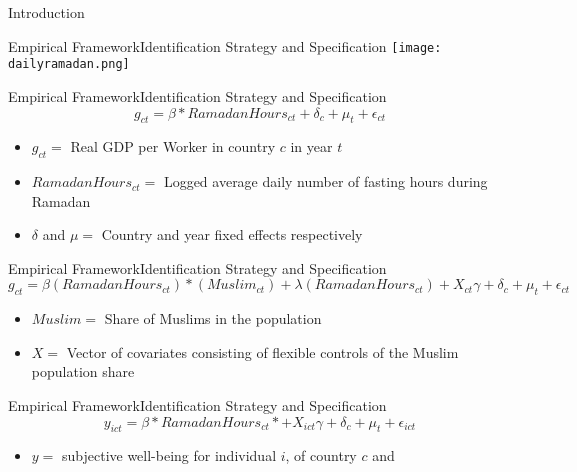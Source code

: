 \documentclass[pdftex,12pt,xcolor=pdftex,table]{beamer}
\begin{document}
\begin{frame}{Introduction}
    \begin{frame}{Empirical Framework}{Identification Strategy and Specification}
    \centering
    \texttt{[image: dailyramadan.png]}
    \end{frame}
    
    \begin{frame}{Empirical Framework}{Identification Strategy and Specification}
    \begin{equation}
    \nonumber g_{ct}=\beta *RamadanHours_{ct}+\delta_c+\mu_t+\epsilon_{ct}
    \end{equation}
    \vspace{0.5cm}
    \begin{itemize}
    \item<2-> $g_{ct}=$ Real GDP per Worker in country $c$ in year $t$
    \item<3-> $RamadanHours_{ct}=$ Logged average daily number of fasting hours during Ramadan
    \item<4-> $\delta$ and $\mu=$ Country and year fixed effects respectively
    \end{itemize}
    \end{frame}
    
    \begin{frame}{Empirical Framework}{Identification Strategy and Specification}
    \begin{equation}
    \nonumber g_{ct}=\beta(RamadanHours_{ct})*(Muslim_{ct})+\lambda(RamadanHours_{ct})
    
    +X_{ct}\gamma+\delta_c+\mu_t+\epsilon_{ct}
    \end{equation}
    \vspace{0.5cm}
    \begin{itemize}
    \item<2-> $Muslim=$ Share of Muslims in the population
    \item<3-> $X=$ Vector of covariates consisting of flexible controls of the Muslim population share
    \end{itemize}
    \end{frame}
    
    \begin{frame}{Empirical Framework}{Identification Strategy and Specification}
    \begin{equation}
    \nonumber y_{ict}=\beta*RamadanHours_{ct}*+X_{ict}\gamma+\delta_c+\mu_t+\epsilon_{ict}
    \end{equation}
    \vspace{0.5cm}
    \begin{itemize}
    \item<2-> $y=$ subjective well-being for individual $i$, of country $c$ and 
    

\end{itemize}
\end{frame}
\end{frame}
\end{document}
